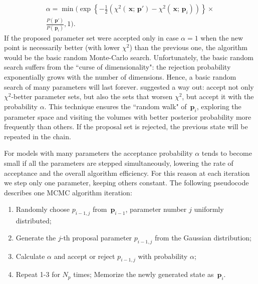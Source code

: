 \documentclass[preprint2]{aastex}
\newcommand{\bp}{\,\mathbf{p}}
\newcommand{\bx}{\,\mathbf{x}}
\begin{document}
\begin{eqnarray}
  \label{accept_probab3}
  \alpha =  \min \biggl( \exp \left\lbrace -\frac{1}{2}\left( \chi^2(\bx;\bp') - 
                        \chi^2(\bx;\bp_i) \right)  \right\rbrace     \times              \nonumber \\
            \frac{P(\bp')} {P(\bp_i)}, 1 \biggr) .    
\end{eqnarray}
If the proposed parameter set were accepted only in case $\alpha=1$ when the new point is necessarily better (with lower $\chi^2$) than the previous one, the algorithm would be the basic random Monte-Carlo search. Unfortunately, the basic random search suffers from the ``curse of dimensionality": the rejection probability exponentially grows with the number of dimensions. Hence, a basic random search of many parameters will last forever. \citet{Metropolis_etal_1953} suggested a way out: accept not only $\chi^2$-better parameter sets, but also the sets that worsen $\chi^2$, but accept it with the probability $\alpha$. This technique ensures the ``random walk" of $\bp_i$, exploring the parameter space and visiting the volumes with better posterior probability more frequently than others. If the proposal set is rejected, the previous state will be repeated in the chain.

For models with many parameters the acceptance probability $\alpha$ tends to become small if all the parameters are stepped simultaneously, lowering the rate of acceptance and the overall algorithm efficiency. For this reason at each iteration we step only one parameter, keeping others constant. The following pseudocode describes one MCMC algorithm iteration:
\begin{enumerate}
\item Randomly choose $p_{i-1,j}$ from $\bp_{i-1}$, parameter number $j$ uniformly distributed;
\item Generate the $j$-th proposal parameter $p_{i-1,j}$ from the Gaussian distribution;
\item Calculate $\alpha$ and accept or reject $p_{i-1,j}$ with probability $\alpha$;
\item Repeat 1-3 for $N_p$ times; Memorize the newly generated state as $\bp_i$.
\end{enumerate}
\end{document}
